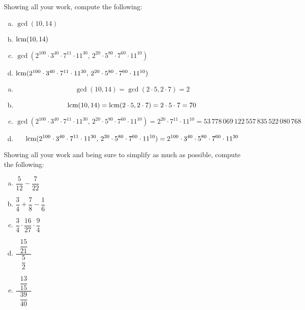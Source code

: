 \documentclass[11pt,letterpaper]{article}
\begin{document}
\newpage



 Showing all your work, compute the following:
	\begin{enumerate}[(a)]
	\item $\gcd(10, 14)$
	\item $\operatorname{lcm}(10, 14)$
	\item $\gcd(2^{100} \cdot 3^{40} \cdot 7^{11} \cdot 11^{30},\, 2^{20} \cdot 5^{80} \cdot 7^{60} \cdot 11^{10})$
	\item $\operatorname{lcm}(2^{100} \cdot 3^{40} \cdot 7^{11} \cdot 11^{30},\, 2^{20} \cdot 5^{80} \cdot 7^{60} \cdot 11^{10})$
	\end{enumerate} \pspace

\sol
\begin{enumerate}[(a)]
\item 
	\[
	\gcd(10, 14)= \gcd(2 \cdot 5, 2 \cdot 7)= 2
	\] \pspace

\item 
	\[
	\operatorname{lcm}(10, 14)= \operatorname{lcm}(2 \cdot 5, 2 \cdot 7)= 2 \cdot 5 \cdot 7= 70
	\] \pspace

\item 
	\[
	\gcd(2^{100} \cdot 3^{40} \cdot 7^{11} \cdot 11^{30},\, 2^{20} \cdot 5^{80} \cdot 7^{60} \cdot 11^{10})= 2^{20} \cdot 7^{11} \cdot 11^{10}= 53\,778\,069\,122\,557\,835\,522\,080\,768
	\] \pspace

\item 
	\[
	\operatorname{lcm}(2^{100} \cdot 3^{40} \cdot 7^{11} \cdot 11^{30},\, 2^{20} \cdot 5^{80} \cdot 7^{60} \cdot 11^{10})= 2^{100} \cdot 3^{40} \cdot 5^{80} \cdot 7^{60} \cdot 11^{30}
	\]
\end{enumerate}



\newpage



 Showing all your work and being sure to simplify as much as possible, compute the following:
	\begin{enumerate}[(a)]
	\item $\dfrac{5}{12} - \dfrac{7}{22}$
	\item $\dfrac{3}{4} + \dfrac{7}{8} - \dfrac{1}{6}$
	\item $\dfrac{3}{4} \cdot \dfrac{16}{27} \cdot \dfrac{9}{4}$
	\item $\dfrac{\;\;\dfrac{15}{21}\;\;}{\;\;\dfrac{5}{2}\;\;}$
	\item $\dfrac{\;\;\dfrac{13}{15}\;\;}{\;\;\dfrac{39}{40}\;\;}$
	\end{enumerate} \pspace
\end{document}
